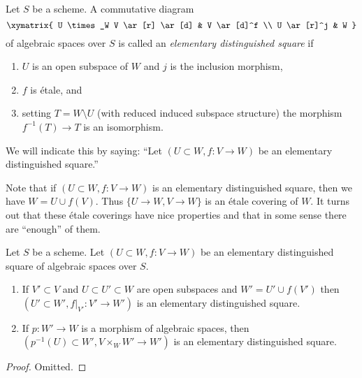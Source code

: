 \begin{definition}
\label{definition-elementary-distinguished-square}
Let $S$ be a scheme. A commutative diagram
$$
\xymatrix{
U \times_W V \ar[r] \ar[d] & V \ar[d]^f \\
U \ar[r]^j & W
}
$$
of algebraic spaces over $S$ is called an {\it elementary distinguished square}
if
\begin{enumerate}
\item $U$ is an open subspace of $W$ and $j$ is the inclusion morphism,
\item $f$ is \'etale, and
\item setting $T = W \setminus U$ (with reduced induced
subspace structure) the morphism $f^{-1}(T) \to T$ is an isomorphism.
\end{enumerate}
We will indicate this by saying: ``Let $(U \subset W, f : V \to W)$
be an elementary distinguished square.''
\end{definition}

\noindent
Note that if $(U \subset W, f : V \to W)$ is an elementary distinguished
square, then we have $W = U \cup f(V)$. Thus $\{U \to W, V \to W\}$ is
an \'etale covering of $W$. It turns out that these \'etale coverings
have nice properties and that in some sense
there are ``enough'' of them.

\begin{lemma}
\label{lemma-make-more-elementary-distinguished-squares}
Let $S$ be a scheme. Let $(U \subset W, f : V \to W)$ be an elementary
distinguished square of algebraic spaces over $S$.
\begin{enumerate}
\item If $V' \subset V$ and
$U \subset U' \subset W$ are open subspaces and $W' = U' \cup f(V')$
then $(U' \subset W', f|_{V'} : V' \to W')$ is an elementary distinguished
square.
\item If $p : W' \to W$ is a morphism of algebraic spaces, then
$(p^{-1}(U) \subset W', V \times_W W' \to W')$ is an elementary distinguished
square.
\end{enumerate}
\end{lemma}

\begin{proof}
Omitted.
\end{proof}

